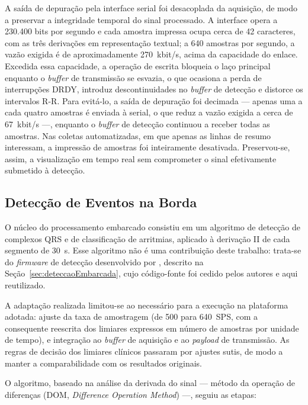 A saída de depuração pela interface serial foi desacoplada da aquisição, de modo a preservar a integridade temporal do sinal processado. A interface opera a 230.400 bits por segundo e cada amostra impressa ocupa cerca de 42 caracteres, com as três derivações em representação textual; a 640 amostras por segundo, a vazão exigida é de aproximadamente 270~kbit/s, acima da capacidade do enlace. Excedida essa capacidade, a operação de escrita bloqueia o laço principal enquanto o \textit{buffer} de transmissão se esvazia, o que ocasiona a perda de interrupções \acs{DRDY}, introduz descontinuidades no \textit{buffer} de detecção e distorce os intervalos R-R. Para evitá-lo, a saída de depuração foi decimada — apenas uma a cada quatro amostras é enviada à serial, o que reduz a vazão exigida a cerca de 67~kbit/s —, enquanto o \textit{buffer} de detecção continuou a receber todas as amostras. Nas coletas automatizadas, em que apenas as linhas de resumo interessam, a impressão de amostras foi inteiramente desativada. Preservou-se, assim, a visualização em tempo real sem comprometer o sinal efetivamente submetido à detecção.

\subsection{Detecção de Eventos na Borda}
\label{sec:deteccaoBorda}

O núcleo do processamento embarcado consistiu em um algoritmo de detecção de complexos QRS e de classificação de arritmias, aplicado à derivação II de cada segmento de 30~s. Esse algoritmo não é uma contribuição deste trabalho: trata-se do \textit{firmware} de detecção desenvolvido por , descrito na Seção~\ref{sec:deteccaoEmbarcada}, cujo código-fonte foi cedido pelos autores e aqui reutilizado. 

A adaptação realizada limitou-se ao necessário para a execução na plataforma adotada: ajuste da taxa de amostragem (de 500 para 640~SPS, com a consequente reescrita dos limiares expressos em número de amostras por unidade de tempo), e integração ao \textit{buffer} de aquisição e ao \textit{payload} de transmissão. As regras de decisão dos limiares clínicos passaram por ajustes sutis, de modo a manter a comparabilidade com os resultados originais.

O algoritmo, baseado na análise da derivada do sinal --- método da operação de diferenças (DOM, \textit{Difference Operation Method}) ---, seguiu as etapas:

